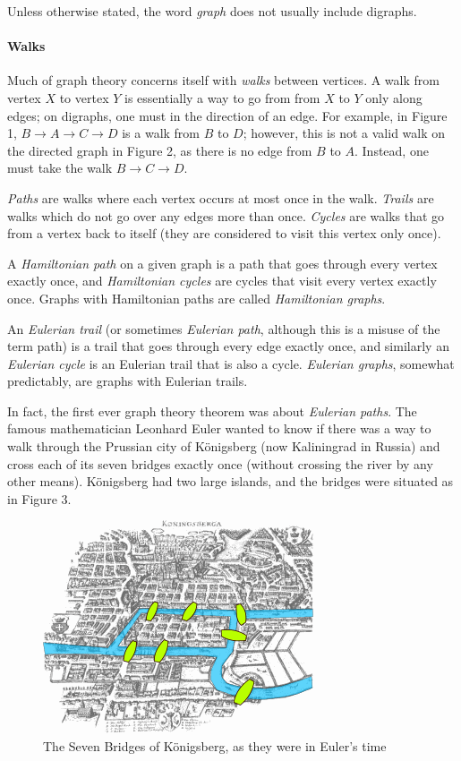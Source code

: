 Unless otherwise stated, the word \textit{graph} does not usually include digraphs.

\paragraph{Walks}

Much of graph theory concerns itself with \textit{walks} between vertices. A walk from vertex \(X\) to vertex \(Y\) is essentially a way to go from from \(X\) to \(Y\)  only along edges; on digraphs, one must  in the direction of an edge. For example, in Figure 1, \(B \rightarrow A \rightarrow C \rightarrow D\) is a walk from \(B\) to \(D\); however, this is not a valid walk on the directed graph in Figure 2, as there is no edge from \(B\) to \(A\). Instead, one must take the walk \(B \rightarrow C \rightarrow D\).

\textit{Paths} are walks where each vertex occurs at most once in the walk. \textit{Trails} are walks which do not go over any edges more than once. \textit{Cycles} are walks that go from a vertex back to itself (they are considered to visit this vertex only once).

A \textit{Hamiltonian path} on a given graph is a path that goes through every vertex exactly once, and \textit{Hamiltonian cycles} are cycles that visit every vertex exactly once. Graphs with Hamiltonian paths are called \textit{Hamiltonian graphs}.

An \textit{Eulerian trail} (or sometimes \textit{Eulerian path}, although this is a misuse of the term path) is a trail that goes through every edge exactly once, and similarly an \textit{Eulerian cycle} is an Eulerian trail that is also a cycle. \textit{Eulerian graphs}, somewhat predictably, are graphs with Eulerian trails.

In fact, the first ever graph theory theorem was about \textit{Eulerian paths}. The famous mathematician Leonhard Euler wanted to know if there was a way to walk through the Prussian city of K\"onigsberg (now Kaliningrad in Russia) and cross each of its seven bridges exactly once (without crossing the river by any other means). K\"onigsberg had two large islands, and the bridges were situated as in Figure 3.



\begin{figure}[h]
\centering
\includegraphics{Konigsberg.png}
\caption{The Seven Bridges of K\"onigsberg, as they were in Euler's time}
\label{Konigsberg}
\end{figure}



